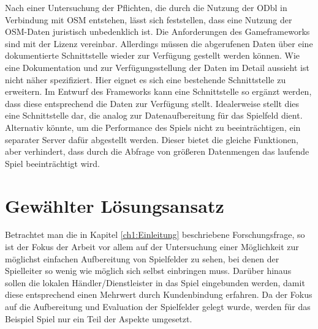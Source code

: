 Nach einer Untersuchung der Pflichten, die durch die Nutzung der ODbl in Verbindung mit OSM entstehen, lässt sich feststellen, dass eine Nutzung der OSM-Daten juristisch unbedenklich ist. 
Die Anforderungen des Gameframeworks sind mit der Lizenz vereinbar.
Allerdings müssen die abgerufenen Daten über eine dokumentierte Schnittstelle wieder zur Verfügung gestellt werden können.
Wie eine Dokumentation und zur Verfügungsstellung der Daten im Detail aussieht ist nicht näher spezifiziert. Hier eignet es sich eine bestehende Schnittstelle zu erweitern. Im Entwurf des Frameworks kann eine Schnittstelle so ergänzt werden, dass diese entsprechend die Daten zur Verfügung stellt. Idealerweise stellt dies eine Schnittstelle dar, die analog zur Datenaufbereitung für das Spielfeld dient. Alternativ könnte, um die Performance des Spiels nicht zu beeinträchtigen, ein separater Server dafür abgestellt werden. Dieser bietet die gleiche Funktionen, aber verhindert, dass durch die Abfrage von größeren Datenmengen das laufende Spiel beeinträchtigt wird.

\section{Gewählter Lösungsansatz}
\label{ch4:s:choosen_solution}

Betrachtet man die in Kapitel \ref{ch1:Einleitung} beschriebene Forschungsfrage, so ist der Fokus der Arbeit vor allem auf der Untersuchung einer Möglichkeit zur möglichst einfachen Aufbereitung von Spielfelder zu sehen, bei denen der Spielleiter so wenig wie möglich sich selbst einbringen muss. Darüber hinaus sollen die lokalen Händler/Dienstleister in das Spiel eingebunden werden, damit diese entsprechend einen Mehrwert durch Kundenbindung erfahren.
Da der Fokus auf die Aufbereitung und Evaluation der Spielfelder gelegt wurde, werden für das Beispiel Spiel nur ein Teil der Aspekte umgesetzt.

